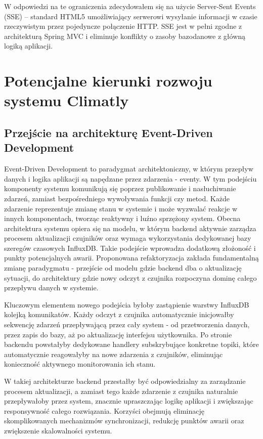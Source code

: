 \documentclass[a4paper,12pt,openany]{book}
\begin{document}
W odpowiedzi na te ograniczenia zdecydowałem się na użycie Server-Sent Events (SSE) -- standard HTML5 umożliwiający serwerowi wysyłanie informacji w czasie rzeczywistym przez pojedyncze połączenie HTTP. SSE jest w pełni zgodne z architekturą Spring MVC i eliminuje konflikty o zasoby bazodanowe z główną logiką aplikacji.

\section{Potencjalne kierunki rozwoju systemu Climatly}

\subsection*{Przejście na architekturę Event-Driven Development}

Event-Driven Development to paradygmat architektoniczny, w którym przepływ danych i logika aplikacji są napędzane przez zdarzenia - eventy. W tym podejściu komponenty systemu komunikują się poprzez publikowanie i nasłuchiwanie zdarzeń, zamiast bezpośredniego wywoływania funkcji czy metod. Każde zdarzenie reprezentuje zmianę stanu w systemie i może wyzwalać reakcje w innych komponentach, tworząc reaktywny i luźno sprzężony system.
Obecna architektura systemu opiera się na modelu, w którym backend aktywnie zarządza procesem aktualizacji czujników oraz wymaga wykorzystania dedykowanej bazy szeregów czasowych InfluxDB. Takie podejście wprowadza dodatkową złożoność i punkty potencjalnych awarii.
Proponowana refaktoryzacja zakłada fundamentalną zmianę paradygmatu - przejście od modelu gdzie backend dba o aktualizację sytuacji, do architektury gdzie nowy odczyt z czujnika rozpoczyna dominę całego przepływu danych w systemie.

Kluczowym elementem nowego podejścia byłoby zastąpienie warstwy InfluxDB kolejką komunikatów. Każdy odczyt z czujnika automatycznie inicjowałby sekwencję zdarzeń przepływającą przez cały system - od przetworzenia danych, przez zapis do bazy, aż po aktualizację interfejsu użytkownika. Po stronie backendu powstałyby dedykowane handlery subskrybujące konkretne topiki, które automatycznie reagowałyby na nowe zdarzenia z czujników, eliminując konieczność aktywnego monitorowania ich stanu.

W takiej architekturze backend przestałby być odpowiedzialny za zarządzanie procesem aktualizacji, a zamiast tego każde zdarzenie z czujnika naturalnie przepływałoby przez system, znacznie upraszczając logikę aplikacji i zwiększając responsywność całego rozwiązania.
Korzyści obejmują eliminację skomplikowanych mechanizmów synchronizacji, redukcję punktów awarii oraz zwiększenie skalowalności systemu.
\end{document}
